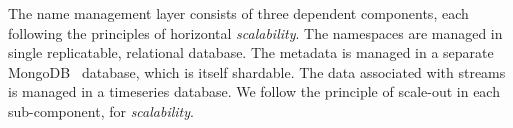 The name management layer consists of three dependent components, each following the principles of horizontal \emph{scalability}.  The namespaces are
managed in single replicatable, relational database.  The metadata is managed in a separate MongoDB~\cite{mongodb} database, which is itself
shardable.  The data associated with streams is managed in a timeseries database.  We follow the principle of scale-out
in each sub-component, for \emph{scalability}.











